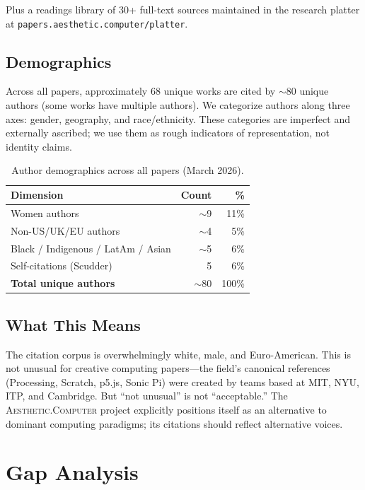 \documentclass[10pt,letterpaper,twocolumn]{article}
\newcommand{\ac}{\textsc{Aesthetic.Computer}}
\begin{document}
Plus a readings library of 30+ full-text sources maintained in the research platter at \texttt{papers.aesthetic.computer/platter}.

\subsection{Demographics}

Across all papers, approximately 68 unique works are cited by $\sim$80 unique authors (some works have multiple authors). We categorize authors along three axes: gender, geography, and race/ethnicity. These categories are imperfect and externally ascribed; we use them as rough indicators of representation, not identity claims.

\begin{table}[h]
\small
\centering
\begin{tabular}{lrr}
\toprule
\textbf{Dimension} & \textbf{Count} & \textbf{\%} \\
\midrule
Women authors & $\sim$9 & 11\% \\
Non-US/UK/EU authors & $\sim$4 & 5\% \\
Black / Indigenous / LatAm / Asian & $\sim$5 & 6\% \\
Self-citations (Scudder) & 5 & 6\% \\
\midrule
\textbf{Total unique authors} & $\sim$80 & 100\% \\
\bottomrule
\end{tabular}
\caption{Author demographics across all papers (March 2026).}
\label{tab:demographics}
\end{table}

\subsection{What This Means}

The citation corpus is overwhelmingly white, male, and Euro-American. This is not unusual for creative computing papers---the field's canonical references (Processing, Scratch, p5.js, Sonic Pi) were created by teams based at MIT, NYU, ITP, and Cambridge. But ``not unusual'' is not ``acceptable.'' The \ac{} project explicitly positions itself as an alternative to dominant computing paradigms; its citations should reflect alternative voices.


\section{Gap Analysis}
\end{document}
